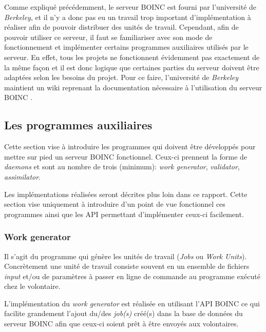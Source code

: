 \documentclass[a4paper, 11pt]{report}
\begin{document}
Comme expliqué précédemment, le serveur \textsc{BOINC} est fourni par l'université de \textit{Berkeley}, et il n'y a donc pas eu un travail trop important d'implémentation à réaliser afin de pouvoir distribuer des unités de travail. Cependant, afin de pouvoir utiliser ce serveur, il faut se familiariser avec son mode de fonctionnement et implémenter certains programmes auxiliaires utilisés par le serveur. En effet, tous les projets ne fonctionnent évidemment pas exactement de la même façon et il est donc logique que certaines parties du serveur doivent être adaptées selon les besoins du projet. Pour ce faire, l'université de \textit{Berkeley} maintient un wiki reprenant la documentation nécessaire à l'utilisation du serveur \textsc{BOINC} \cite{WIKI}.

\subsection{Les programmes auxiliaires}
\label{daemons}
Cette section vise à introduire les programmes qui doivent être développés pour mettre sur pied un serveur \textsc{BOINC} fonctionnel. Ceux-ci prennent la forme de \textit{daemons} et sont au nombre de trois (minimum): \textit{work generator}, \textit{validator}, \textit{assimilator}. 

Les implémentations réalisées seront décrites plus loin dans ce rapport. %
Cette section vise uniquement à introduire d'un point de vue fonctionnel ces programmes ainsi que les API permettant d'implémenter ceux-ci facilement.

\subsubsection{Work generator}
Il s'agit du programme qui génère les unités de travail (\textit{Jobs} ou \textit{Work Units}). Concrètement une unité de travail consiste souvent en un ensemble de fichiers \textit{input} et/ou de paramètres à passer en ligne de commande au programme exécuté chez le volontaire. 

L'implémentation du \textit{work generator} est réalisée en utilisant l'API \textsc{BOINC} ce qui facilite grandement l'ajout du/des \textit{job(s)} créé(s) dans la base de données du serveur \textsc{BOINC} afin que ceux-ci soient prêt à être envoyés aux volontaires.
\end{document}
